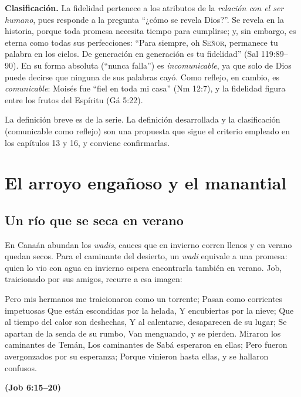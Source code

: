 \documentclass[11pt,letterpaper]{article}
\newcommand{\SENOR}{\textsc{Señor}}
\newcommand{\fuente}[1]{\par\hfill{\upshape\bfseries\small\textcolor{azul}{#1}}}
\begin{document}
\textbf{Clasificación.} La fidelidad pertenece a los atributos de la \emph{relación con el ser humano}, pues responde a la pregunta ``¿cómo se revela Dios?''. Se revela en la historia, porque toda promesa necesita tiempo para cumplirse; y, sin embargo, es eterna como todas sus perfecciones: ``Para siempre, oh \SENOR, permanece tu palabra en los cielos. De generación en generación es tu fidelidad'' (Sal 119:89--90). En su forma absoluta (``nunca falla'') es \emph{incomunicable}, ya que solo de Dios puede decirse que ninguna de sus palabras cayó. Como reflejo, en cambio, es \emph{comunicable}: Moisés fue ``fiel en toda mi casa'' (Nm 12:7), y la fidelidad figura entre los frutos del Espíritu (Gá 5:22).

\begin{nota}[Precisión]
La definición breve es de la serie. La definición desarrollada y la clasificación (comunicable como reflejo) son una propuesta que sigue el criterio empleado en los capítulos 13 y 16, y conviene confirmarlas.
\end{nota}

\section{El arroyo engañoso y el manantial}\label{sec:arroyo-fiel}

\subsection{Un río que se seca en verano}
En Canaán abundan los \emph{wadis}, cauces que en invierno corren llenos y en verano quedan secos. Para el caminante del desierto, un \emph{wadi} equivale a una promesa: quien lo vio con agua en invierno espera encontrarla también en verano. Job, traicionado por sus amigos, recurre a esa imagen:

\begin{cita}Pero mis hermanos me traicionaron como un torrente; Pasan como corrientes impetuosas Que están escondidas por la helada, Y encubiertas por la nieve; Que al tiempo del calor son deshechas, Y al calentarse, desaparecen de su lugar; Se apartan de la senda de su rumbo, Van menguando, y se pierden. Miraron los caminantes de Temán, Los caminantes de Sabá esperaron en ellas; Pero fueron avergonzados por su esperanza; Porque vinieron hasta ellas, y se hallaron confusos.\fuente{(Job 6:15--20)}\end{cita}
\end{document}

